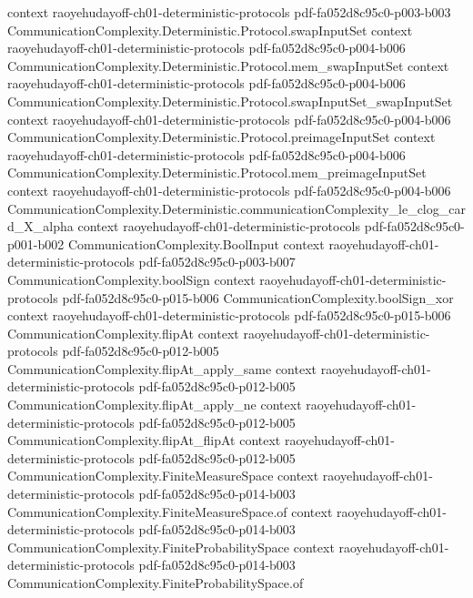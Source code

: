 \begin{theorem}
  {context}
  {raoyehudayoff-ch01-deterministic-protocols}
  {pdf-fa052d8c95c0-p003-b003}
\proofstep
  {CommunicationComplexity.Deterministic.Protocol.swapInputSet}
  {context}
  {raoyehudayoff-ch01-deterministic-protocols}
  {pdf-fa052d8c95c0-p004-b006}
\proofstep
  {CommunicationComplexity.Deterministic.Protocol.mem_swapInputSet}
  {context}
  {raoyehudayoff-ch01-deterministic-protocols}
  {pdf-fa052d8c95c0-p004-b006}
\proofstep
  {CommunicationComplexity.Deterministic.Protocol.swapInputSet_swapInputSet}
  {context}
  {raoyehudayoff-ch01-deterministic-protocols}
  {pdf-fa052d8c95c0-p004-b006}
\proofstep
  {CommunicationComplexity.Deterministic.Protocol.preimageInputSet}
  {context}
  {raoyehudayoff-ch01-deterministic-protocols}
  {pdf-fa052d8c95c0-p004-b006}
\proofstep
  {CommunicationComplexity.Deterministic.Protocol.mem_preimageInputSet}
  {context}
  {raoyehudayoff-ch01-deterministic-protocols}
  {pdf-fa052d8c95c0-p004-b006}
\proofstep
  {CommunicationComplexity.Deterministic.communicationComplexity_le_clog_card_X_alpha}
  {context}
  {raoyehudayoff-ch01-deterministic-protocols}
  {pdf-fa052d8c95c0-p001-b002}
\proofstep
  {CommunicationComplexity.BoolInput}
  {context}
  {raoyehudayoff-ch01-deterministic-protocols}
  {pdf-fa052d8c95c0-p003-b007}
\proofstep
  {CommunicationComplexity.boolSign}
  {context}
  {raoyehudayoff-ch01-deterministic-protocols}
  {pdf-fa052d8c95c0-p015-b006}
\proofstep
  {CommunicationComplexity.boolSign_xor}
  {context}
  {raoyehudayoff-ch01-deterministic-protocols}
  {pdf-fa052d8c95c0-p015-b006}
\proofstep
  {CommunicationComplexity.flipAt}
  {context}
  {raoyehudayoff-ch01-deterministic-protocols}
  {pdf-fa052d8c95c0-p012-b005}
\proofstep
  {CommunicationComplexity.flipAt_apply_same}
  {context}
  {raoyehudayoff-ch01-deterministic-protocols}
  {pdf-fa052d8c95c0-p012-b005}
\proofstep
  {CommunicationComplexity.flipAt_apply_ne}
  {context}
  {raoyehudayoff-ch01-deterministic-protocols}
  {pdf-fa052d8c95c0-p012-b005}
\proofstep
  {CommunicationComplexity.flipAt_flipAt}
  {context}
  {raoyehudayoff-ch01-deterministic-protocols}
  {pdf-fa052d8c95c0-p012-b005}
\proofstep
  {CommunicationComplexity.FiniteMeasureSpace}
  {context}
  {raoyehudayoff-ch01-deterministic-protocols}
  {pdf-fa052d8c95c0-p014-b003}
\proofstep
  {CommunicationComplexity.FiniteMeasureSpace.of}
  {context}
  {raoyehudayoff-ch01-deterministic-protocols}
  {pdf-fa052d8c95c0-p014-b003}
\proofstep
  {CommunicationComplexity.FiniteProbabilitySpace}
  {context}
  {raoyehudayoff-ch01-deterministic-protocols}
  {pdf-fa052d8c95c0-p014-b003}
\proofstep
  {CommunicationComplexity.FiniteProbabilitySpace.of}

\end{theorem}
